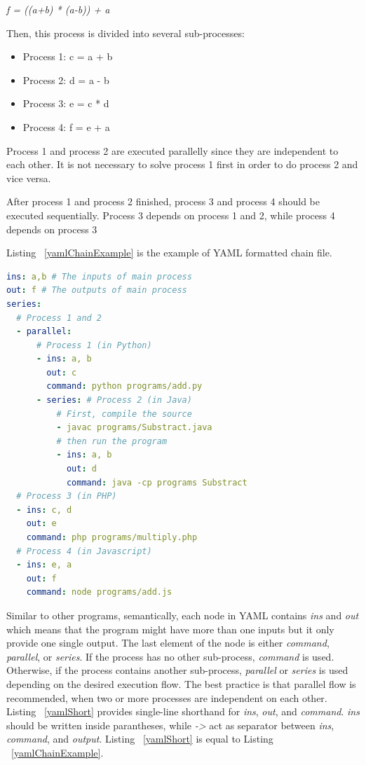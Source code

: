 \documentclass[conference]{IEEEtran}
\begin{document}
{\it f = ((a+b) * (a-b)) + a}

Then, this process is divided into several sub-processes:

\begin{itemize}
    \item Process 1: c = a + b
    \item Process 2: d = a - b
    \item Process 3: e = c * d
    \item Process 4: f = e + a
\end{itemize}

Process 1 and process 2 are executed parallelly since they are independent to each other. 
It is not necessary to solve process 1 first in order to do process 2 and vice versa.

After process 1 and process 2 finished, process 3 and process 4 should be executed sequentially. 
Process 3 depends on process 1 and 2, while process 4 depends on process 3

Listing ~\ref{yamlChainExample} is the example of YAML formatted chain file.

\begin{lstlisting}[caption=YAML Chain Example, label=yamlChainExample, language=yaml, basicstyle=\small, breaklines=true]
ins: a,b # The inputs of main process 
out: f # The outputs of main process 
series:
  # Process 1 and 2 
  - parallel:
      # Process 1 (in Python) 
      - ins: a, b
        out: c
        command: python programs/add.py
      - series: # Process 2 (in Java) 
          # First, compile the source  
          - javac programs/Substract.java
          # then run the program 
          - ins: a, b
            out: d
            command: java -cp programs Substract
  # Process 3 (in PHP) 
  - ins: c, d
    out: e
    command: php programs/multiply.php
  # Process 4 (in Javascript) 
  - ins: e, a
    out: f
    command: node programs/add.js
\end{lstlisting}

Similar to other programs, semantically, each node in YAML contains {\it ins} and {\it out } which means that the program might have more than one inputs but it only provide one single output. 
The last element of the node is either {\it command}, {\it parallel}, or {\it series}. 
If the process has no other sub-process, {\it command} is used. Otherwise, if the
process contains another sub-process, {\it parallel} or {\it series} is used depending
on the desired execution flow. The best practice is that parallel flow is recommended, when two or more processes
are independent on each other. Listing  ~\ref{yamlShort} provides single-line shorthand for {\it ins}, {\it out}, 
and {\it command}. {\it ins} should be written inside parantheses, while {\it ->}
act as separator between {\it ins}, {\it command}, and {\it output}. 
Listing  ~\ref{yamlShort} is equal to Listing ~\ref{yamlChainExample}.
\end{document}
